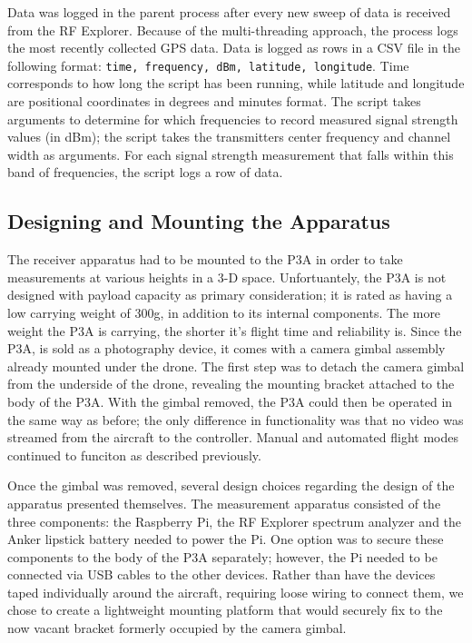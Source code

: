 \documentclass[pageno]{jpaper}
\begin{document}
Data was logged in the parent process after every new sweep of data is received from the RF Explorer. Because of the multi-threading approach, the process logs the most recently collected GPS data. Data is logged as rows in a CSV file in the following format: \texttt{time, frequency, dBm, latitude, longitude}. Time corresponds to how long the script has been running, while latitude and longitude are positional coordinates in degrees and minutes format. The script takes arguments to determine for which frequencies to record measured signal strength values (in dBm); the script takes the transmitters center frequency and channel width as arguments. For each signal strength measurement that falls within this band of frequencies, the script logs a row of data.  

\subsection{Designing and Mounting the Apparatus}
The receiver apparatus had to be mounted to the P3A in order to take measurements at various heights in a 3-D space. Unfortuantely, the P3A is not designed with payload capacity as primary consideration; it is rated as having a low carrying weight of 300g, in addition to its internal components. The more weight the P3A is carrying, the shorter it's flight time and reliability is. Since the P3A, is sold as a photography device, it comes with a camera gimbal assembly already mounted under the drone. The first step was to detach the camera gimbal from the underside of the drone, revealing the mounting bracket attached to the body of the P3A. With the gimbal removed, the P3A could then be operated in the same way as before; the only difference in functionality was that no video was streamed from the aircraft to the controller. Manual and automated flight modes continued to funciton as described previously. 

 Once the gimbal was removed, several design choices regarding the design of the apparatus presented themselves. The measurement apparatus consisted of the three components: the Raspberry Pi, the RF Explorer spectrum analyzer and the Anker lipstick battery needed to power the Pi. One option was to secure these components to the body of the P3A separately; however, the Pi needed to be connected via USB cables to the other devices. Rather than have the devices taped individually around the aircraft, requiring loose wiring to connect them, we chose to create a lightweight mounting platform that would securely fix to the now vacant bracket formerly occupied by the camera gimbal. 
\end{document}
